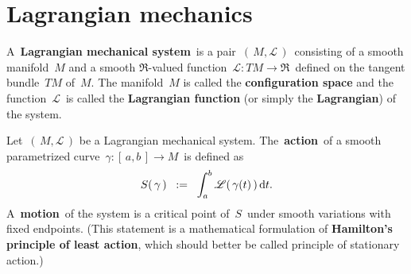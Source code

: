 

\chapter{Lagrangian mechanics}
\setcounter{theorem}{0}
\setcounter{equation}{0}


\renewcommand{\theenumi}{\roman{enumi}}
\renewcommand{\labelenumi}{\textnormal{(\theenumi)}$\;\;$}


\begin{definition}
\mbox{}
\vskip 0.1cm
\noindent
A \,\textbf{Lagrangian mechanical system}\, is a pair \,$\left(\,M,\mathscr{L}\,\right)$\,
consisting of a smooth manifold \,$M$ and a smooth $\Re$-valued function
\,$\mathscr{L} : TM \longrightarrow \Re$\,
defined on the tangent bundle \,$TM$ of \,$M$.
The manifold \,$M$ is called the \textbf{configuration space} and
the function \,$\mathscr{L}$\, is called the \textbf{Lagrangian function}
(or simply the \textbf{Lagrangian}) of the system.
\end{definition}


\vskip 0.5cm
\begin{definition}
\mbox{}
\vskip 0.1cm
\noindent
Let \,$\left(\,M,\mathscr{L}\,\right)$ be a Lagrangian mechanical system.
The \,\textbf{action}\, of a smooth parametrized curve
\,$\gamma : [\,a, b\,] \longrightarrow M$\,
is defined as
\begin{equation*}
S(\,\gamma\,)
\;\; := \;\;
\int_{a}^{b}
\mathscr{L}(\,\gamma(t)\,)\,\textnormal{d} t.
\end{equation*}
A \,\textbf{motion}\, of the system is a critical point of \,$S$\,
under smooth variations with fixed endpoints.
(This statement is a mathematical formulation of
\textbf{Hamilton's principle of least action},
which should better be called principle of {\color{red}stationary} action.)
\end{definition}


